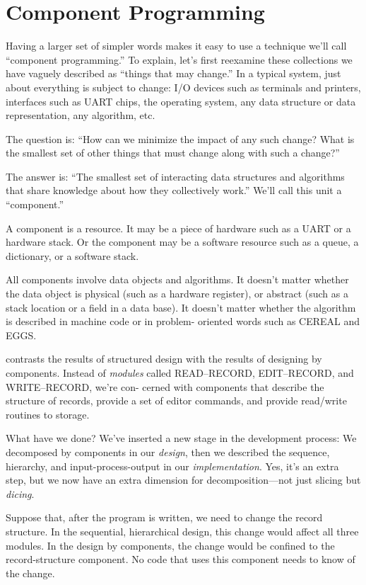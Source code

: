 \section{Component Programming}

Having a larger set of simpler words makes it easy to use a technique
we'll call ``component programming.'' To explain, let's first reexamine
these collections we have vaguely described as ``things that may change.''
In a typical system, just about everything is subject to change: I/O
devices such as terminals and printers, interfaces such as UART chips,
the operating system, any data structure or data representation, any
algorithm, etc.

The question is: ``How can we minimize the impact of any such change?
What is the smallest set of other things that must change along with
such a change?''

The answer is: ``The smallest set of interacting data structures and
algorithms that share knowledge about how they collectively work.''
We'll call this unit a ``component.''

A component is a resource. It may be a piece of hardware such as a
UART or a hardware stack. Or the component may be a software resource
such as a queue, a dictionary, or a software stack.

All components involve data objects and algorithms. It doesn't matter
whether the data object is physical (such as a hardware register),
or abstract (such as a stack location or a field in a data base).
It doesn't matter whether the algorithm is described in machine code
or in problem- oriented words such as CEREAL and EGGS.

 contrasts the results of structured design with the results
of designing by components. Instead of \emph{modules} called READ--RECORD,
EDIT--RECORD, and WRITE--RECORD, we're con- cerned with components
that describe the structure of records, provide a set of editor commands,
and provide read/write routines to storage.

What have we done? We've inserted a new stage in the development process:
We decomposed by components in our \emph{design}, then we described
the sequence, hierarchy, and input-process-output in our \emph{implementation}.
Yes, it's an extra step, but we now have an extra dimension for decomposition---not
just slicing but \emph{dicing}.

Suppose that, after the program is written, we need to change the
record structure. In the sequential, hierarchical design, this change
would affect all three modules. In the design by components, the change
would be confined to the record-structure component. No code that
uses this component needs to know of the change.

